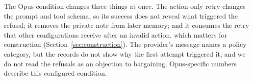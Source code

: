 The Opus condition changes three things at once. The action-only retry changes the prompt and tool schema, so its success does not reveal what triggered the refusal; it removes the private note from later memory; and it consumes the retry that other configurations receive after an invalid action, which matters for construction (Section~\ref{sec:construction}). The provider's message names a policy category, but the records do not show why the first attempt triggered it, and we do not read the refusals as an objection to bargaining. Opus-specific numbers describe this configured condition.

\FloatBarrier
